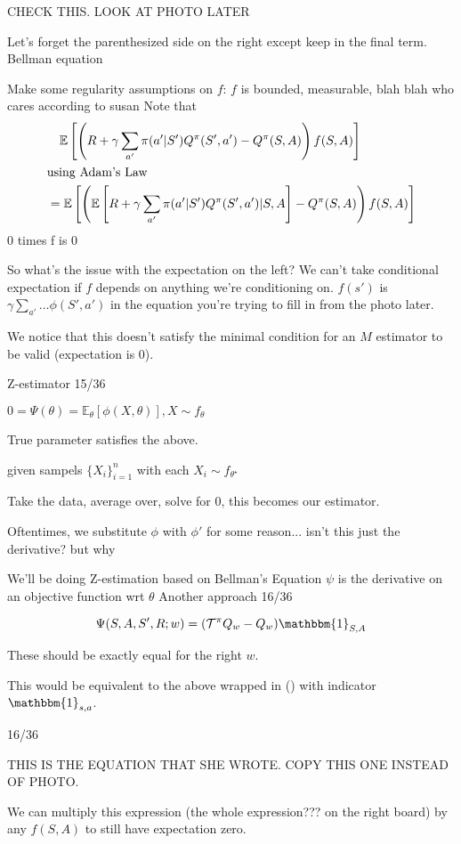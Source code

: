 \documentclass[11pt]{article}
\begin{document}
CHECK THIS. LOOK AT PHOTO LATER

Let's forget the parenthesized side on the right except keep in the final term. Bellman equation

Make some regularity assumptions on $f$: $f$ is bounded, measurable, blah blah who cares according to susan
Note that 
\begin{align*}
&\quad \mathbb{E}\left[ \left(R+\gamma \sum_{a'} \pi(a'|S')Q^\pi(S', a') - Q^\pi(S,A)\right)f(S,A) \right] \\ 
& \text{using Adam's Law} \\
&=\mathbb{E}\left[ \left(\mathbb{E}\left[ R+\gamma \sum_{a'} \pi(a'|S')Q^\pi(S', a')|S,A \right] - Q^\pi(S,A)\right)f(S,A) \right]
\end{align*}
0 times f is 0

So what's the issue with the expectation on the left? We can't take conditional expectation if $f$ depends on anything we're conditioning on. $f(s')$ is $\gamma \sum_{a'} \dots \phi(S', a')$ in the equation you're trying to fill in from the photo later. 

We notice that this doesn't satisfy the minimal condition for an $M$ estimator to be valid (expectation is 0).

Z-estimator
15/36

$0 = \Psi(\theta) = \mathbb{E}_\theta\left[\phi(X,\theta)\right], X \sim f_\theta$

True parameter satisfies the above.

given sampels $\{X_i\}_{i = 1}^n$ with each $X_i \sim f_{\theta^\star}$

Take the data, average over, solve for 0, this becomes our estimator.

Oftentimes, we substitute $\phi$ with $\phi'$ for some reason...
isn't this just the derivative? but why

We'll be doing Z-estimation based on Bellman's Equation
$\psi$ is the derivative  on an objective function wrt $\theta$
Another approach
16/36

$$\Psi(S,A,S',R;w) = (\mathcal{T}^\pi Q_w - Q_w)\mathbbm{1}_{S, A}$$

These should be exactly equal for the right $w$. 

This would be equivalent to the above wrapped in () with indicator $\mathbbm{1}_{s,a}$.

16/36

THIS IS THE EQUATION THAT SHE WROTE. COPY THIS ONE INSTEAD OF PHOTO.

We can multiply this expression (the whole expression??? on the right board) by any $f(S, A)$ to still have expectation zero. 
\end{document}
